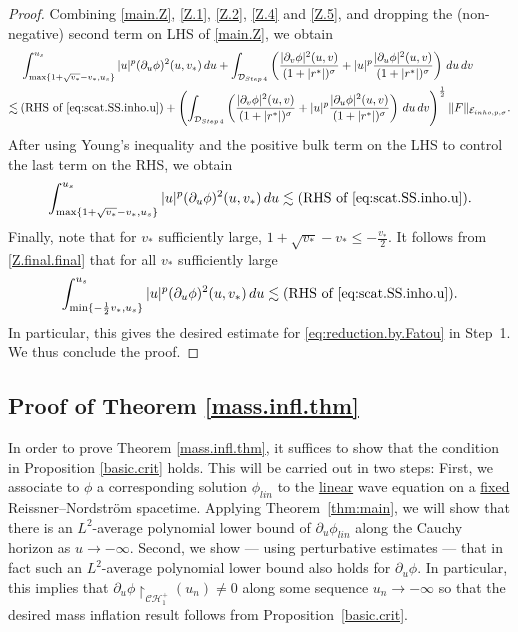 \documentclass[10pt, reqno]{amsart}
\theoremstyle{definition}
\theoremstyle{remark}
\numberwithin{equation}{section}
\def\ls{\lesssim}
\newcommand{\rd}{\partial}
\newcommand{\0}{\emptyset}
\newcommand{\calC}{\mathcal C}
\newcommand{\calH}{\mathcal H}
\newcommand{\f}{\frac}
\newcommand{\CH}{\calC \calH^{+}}		%
\begin{document}
\begin{proof}
Combining \eqref{main.Z}, \eqref{Z.1}, \eqref{Z.2}, \eqref{Z.4} and \eqref{Z.5}, and dropping the (non-negative) second term on LHS of \eqref{main.Z}, we obtain
\begin{equation}\label{Z.final}
\begin{split}
&\:\int_{\max\{1+\sqrt{v_*}-v_*,u_s\}}^{u_s} |u|^p(\rd_u\phi)^2(u,v_*)\, du+\int_{\mathcal D_{Step\,4}}\left(\f{|\rd_v\phi|^2(u,v)}{(1+|r^*|)^{\sigma}}+|u|^{p}\f{|\rd_u\phi|^2(u,v)}{(1+|r^*|)^{\sigma}}\right)\,du\,dv\\
\ls &\:\mbox{(RHS of \eqref{eq:scat.SS.inho.u})}
+ \left(\int_{\mathcal D_{Step\,4}}\left(\f{|\rd_v\phi|^2(u,v)}{(1+|r^*|)^{\sigma}}+|u|^{p}\f{|\rd_u\phi|^2(u,v)}{(1+|r^*|)^{\sigma}}\right)\,du\,dv\right)^{\f 12} \|F\|_{\mathcal E_{inho,p,\sigma}}.
\end{split}
\end{equation}
After using Young's inequality and the positive bulk term on the LHS to control the last term on the RHS, we obtain
\begin{equation}\label{Z.final.final}
\int_{\max\{1+\sqrt{v_*}-v_*,u_s\}}^{u_s} |u|^p(\rd_u\phi)^2(u,v_*)\, du \ls \mbox{(RHS of \eqref{eq:scat.SS.inho.u})}.
\end{equation}
Finally, note that for $v_*$ sufficiently large, $1+\sqrt{v_*}-v_*\leq -\f{v_*}{2}$. It follows from \eqref{Z.final.final} that for all $v_*$ sufficiently large
\begin{equation}
\int_{\min\{-\f 12 v_*,u_s\}}^{u_s} |u|^p (\rd_u\phi)^2(u,v_*)\, du \ls \mbox{(RHS of \eqref{eq:scat.SS.inho.u})}.
\end{equation}
In particular, this gives the desired estimate for \eqref{eq:reduction.by.Fatou} in Step~1. We thus conclude the proof. \qedhere
\end{proof}

\subsection{Proof of Theorem \ref{mass.infl.thm}}\label{sec:proofofmassinflation}

In order to prove Theorem \ref{mass.infl.thm}, it suffices to show that the condition in Proposition \ref{basic.crit} holds. This will be carried out in two steps: First, we associate to $\phi$ a corresponding solution $\phi_{lin}$ to the \underline{linear} wave equation on a \underline{fixed} Reissner--Nordstr\"om spacetime. Applying Theorem~\ref{thm:main}, we will show that there is an $L^2$-average polynomial lower bound of $\rd_u\phi_{lin}$ along the Cauchy horizon as $u\to -\infty$. Second, we show --- using perturbative estimates --- that in fact such an $L^2$-average polynomial lower bound also holds for $\rd_u\phi$. In particular, this implies that $\rd_u\phi\restriction_{\CH_1}(u_n) \neq 0$ along some sequence $u_n\to -\infty$ so that the desired mass inflation result follows from Proposition~\ref{basic.crit}.
\end{document}
